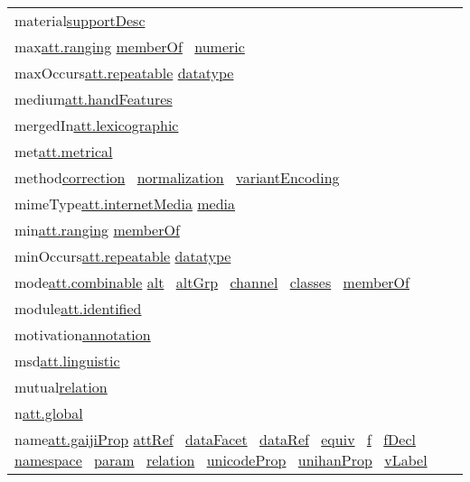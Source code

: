 \begin{longtable}{L{.2\textwidth}P{.8\textwidth}}
material\tabcellsep \hyperref[TEI.supportDesc]{supportDesc} \\
max\tabcellsep \hyperref[TEI.att.ranging]{att.ranging} \hyperref[TEI.memberOf]{memberOf}  \hyperref[TEI.numeric]{numeric} \\
maxOccurs\tabcellsep \hyperref[TEI.att.repeatable]{att.repeatable} \hyperref[TEI.datatype]{datatype} \\
medium\tabcellsep \hyperref[TEI.att.handFeatures]{att.handFeatures}\\
mergedIn\tabcellsep \hyperref[TEI.att.lexicographic]{att.lexicographic}\\
met\tabcellsep \hyperref[TEI.att.metrical]{att.metrical}\\
method\tabcellsep \hyperref[TEI.correction]{correction}  \hyperref[TEI.normalization]{normalization}  \hyperref[TEI.variantEncoding]{variantEncoding} \\
mimeType\tabcellsep \hyperref[TEI.att.internetMedia]{att.internetMedia} \hyperref[TEI.media]{media} \\
min\tabcellsep \hyperref[TEI.att.ranging]{att.ranging} \hyperref[TEI.memberOf]{memberOf} \\
minOccurs\tabcellsep \hyperref[TEI.att.repeatable]{att.repeatable} \hyperref[TEI.datatype]{datatype} \\
mode\tabcellsep \hyperref[TEI.att.combinable]{att.combinable} \hyperref[TEI.alt]{alt}  \hyperref[TEI.altGrp]{altGrp}  \hyperref[TEI.channel]{channel}  \hyperref[TEI.classes]{classes}  \hyperref[TEI.memberOf]{memberOf} \\
module\tabcellsep \hyperref[TEI.att.identified]{att.identified}\\
motivation\tabcellsep \hyperref[TEI.annotation]{annotation} \\
msd\tabcellsep \hyperref[TEI.att.linguistic]{att.linguistic}\\
mutual\tabcellsep \hyperref[TEI.relation]{relation} \\
n\tabcellsep \hyperref[TEI.att.global]{att.global}\\
name\tabcellsep \hyperref[TEI.att.gaijiProp]{att.gaijiProp} \hyperref[TEI.attRef]{attRef}  \hyperref[TEI.dataFacet]{dataFacet}  \hyperref[TEI.dataRef]{dataRef}  \hyperref[TEI.equiv]{equiv}  \hyperref[TEI.f]{f}  \hyperref[TEI.fDecl]{fDecl}  \hyperref[TEI.namespace]{namespace}  \hyperref[TEI.param]{param}  \hyperref[TEI.relation]{relation}  \hyperref[TEI.unicodeProp]{unicodeProp}  \hyperref[TEI.unihanProp]{unihanProp}  \hyperref[TEI.vLabel]{vLabel} \\

\end{longtable}
